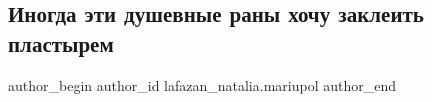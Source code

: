  
 
 
 
 

\subsection{Иногда эти душевные раны хочу заклеить пластырем}
\label{sec:24_03_2023.fb.lafazan_natalia.mariupol.1.rany_plastyr}

\ifcmt
 author_begin
   author_id lafazan_natalia.mariupol
 author_end
\fi
